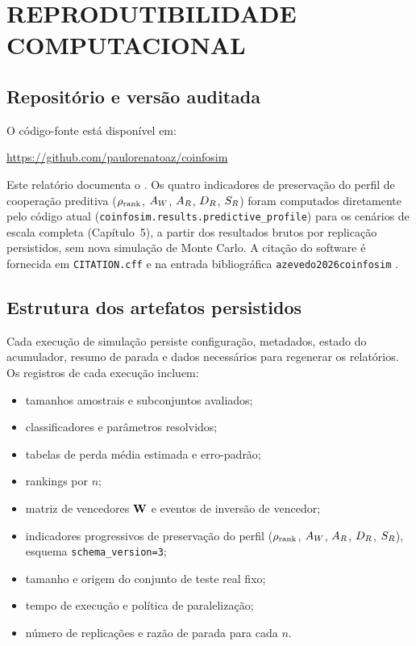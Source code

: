 \chapter{REPRODUTIBILIDADE COMPUTACIONAL}
\label{ap:reprodutibilidade}

\section{Repositório e versão auditada}

O código-fonte está disponível em:

\begin{center}
\url{https://github.com/paulorenatoaz/coinfosim}
\end{center}

Este relatório documenta o \CoInfoSim{} \CoInfoSimVersion{}. Os quatro indicadores de preservação do perfil de cooperação preditiva ($\rho_{\mathrm{rank}}$, $A_W$, $A_R$, $D_R$, $S_R$) foram computados diretamente pelo código atual (\texttt{coinfosim.results.predictive\_profile}) para os cenários de escala completa (Capítulo~5), a partir dos resultados brutos por replicação persistidos, sem nova simulação de Monte Carlo. A citação do software é fornecida em \texttt{CITATION.cff} e na entrada bibliográfica \texttt{azevedo2026coinfosim} \cite{azevedo2026coinfosim}.

\section{Estrutura dos artefatos persistidos}

Cada execução de simulação persiste configuração, metadados, estado do acumulador, resumo de parada e dados necessários para regenerar os relatórios. Os registros de cada execução incluem:

\begin{itemize}
  \item tamanhos amostrais e subconjuntos avaliados;
  \item classificadores e parâmetros resolvidos;
  \item tabelas de perda média estimada e erro-padrão;
  \item rankings por $n$;
  \item matriz de vencedores $\mathbf{W}$ e eventos de inversão de vencedor;
  \item indicadores progressivos de preservação do perfil ($\rho_{\mathrm{rank}}$, $A_W$, $A_R$, $D_R$, $S_R$), esquema \texttt{schema\_version=3};
  \item tamanho e origem do conjunto de teste real fixo;
  \item tempo de execução e política de paralelização;
  \item número de replicações e razão de parada para cada $n$.
\end{itemize}

